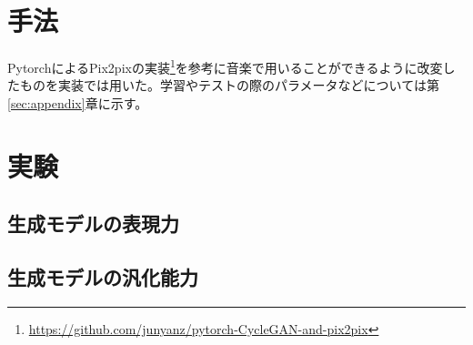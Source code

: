 \section{手法}

PytorchによるPix2pixの実装\footnote{\url{https://github.com/junyanz/pytorch-CycleGAN-and-pix2pix}}を参考に音楽で用いることができるように改変したものを実装では用いた。学習やテストの際のパラメータなどについては第\ref{sec:appendix}章に示す。






\section{実験}

\subsection{生成モデルの表現力}


\subsection{生成モデルの汎化能力}


